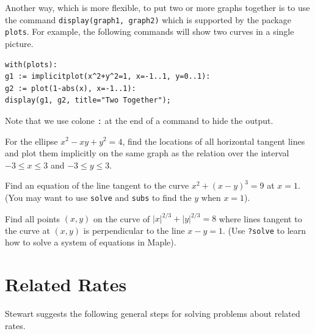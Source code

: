 \documentclass[]{book}
\theoremstyle{definition}
\theoremstyle{definition}
\theoremstyle{definition}
\theoremstyle{remark}
\let\BeginKnitrBlock\begin \let\EndKnitrBlock\end
\begin{document}
\BeginKnitrBlock{remark}
{}
Another way, which is more flexible, to put two or more graphs together is to use the command \texttt{display(graph1,\ graph2)} which is supported by the package \texttt{plots}. For example, the following commands will show two curves in a single picture.

\begin{verbatim}
with(plots):
g1 := implicitplot(x^2+y^2=1, x=-1..1, y=0..1):
g2 := plot(1-abs(x), x=-1..1):
display(g1, g2, title="Two Together");
\end{verbatim}

Note that we use colone \texttt{:} at the end of a command to hide the output.
\EndKnitrBlock{remark}

\BeginKnitrBlock{exercise}
\protect\hypertarget{exr:unnamed-chunk-68}{}{\label{exr:unnamed-chunk-68} }
For the ellipse \(x^2-xy+y^2=4\), find the locations of all horizontal tangent lines and plot them implicitly on the same graph as the relation over the interval \(-3 \leq x \leq 3\) and \(-3 \leq y \leq 3\).
\EndKnitrBlock{exercise}

\BeginKnitrBlock{exercise}
\protect\hypertarget{exr:unnamed-chunk-69}{}{\label{exr:unnamed-chunk-69} }
Find an equation of the line tangent to the curve \(x^2 + (x-y)^3 = 9\) at \(x=1\). (You may want to use \texttt{solve} and \texttt{subs} to find the \(y\) when \(x=1\)).
\EndKnitrBlock{exercise}

\BeginKnitrBlock{exercise}
\protect\hypertarget{exr:unnamed-chunk-70}{}{\label{exr:unnamed-chunk-70} }
Find all points \((x, y)\) on the curve of \(|x|^{2/3} + |y|^{2/3} = 8\) where lines tangent to the curve at \((x, y)\) is perpendicular to the line \(x-y=1\). (Use \texttt{?solve} to learn how to solve a system of equations in Maple).
\EndKnitrBlock{exercise}

\hypertarget{related-rates}{%
\section{Related Rates}\label{related-rates}}

Stewart suggests the following general steps for solving problems about related rates.
\end{document}
